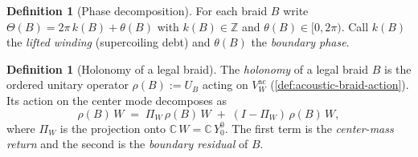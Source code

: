 \documentclass[11pt,a4paper]{article}
\theoremstyle{plain}
\theoremstyle{definition}
\newtheorem{definition}[theorem]{Definition}
\theoremstyle{remark}
\numberwithin{equation}{section}
\newcommand{\Complex}{\mathbb{C}}
\newcommand{\Z}{\mathbb{Z}}
\begin{document}
\begin{definition}[Phase decomposition]
\label{def:phase-decomp}
For each braid $B$ write
$\Theta(B)=2\pi\,k(B)+\theta(B)$ with $k(B)\in\Z$ and
$\theta(B)\in[0,2\pi)$.  Call $k(B)$ the \emph{lifted winding}
(supercoiling debt) and $\theta(B)$ the \emph{boundary phase}.
\end{definition}

\medskip

\begin{definition}[Holonomy of a legal braid]
\label{def:braid-holonomy}
The \emph{holonomy} of a legal braid $B$ is the ordered unitary
operator $\rho(B):=U_B$ acting on $V_W^{\mathrm{ac}}$
(\cref{def:acoustic-braid-action}).  Its action on the center
mode decomposes as
\[
  \rho(B)\,W
  \;=\;\Pi_W\,\rho(B)\,W\;+\;(I-\Pi_W)\,\rho(B)\,W,
\]
where $\Pi_W$ is the projection onto $\Complex\,W=\Complex\,Y_0^0$.
The first term is the \emph{center-mass return} and the second is
the \emph{boundary residual} of $B$.
\end{definition}
\end{document}
